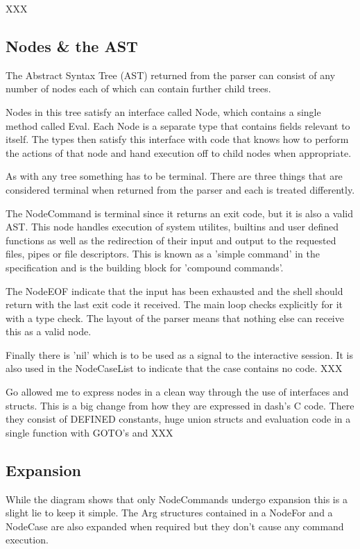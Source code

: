 XXX %

\subsection{Nodes \& the AST}
The Abstract Syntax Tree (AST) returned from the parser can consist of any number of nodes each of which can contain further child trees.

Nodes in this tree satisfy an interface called Node, which contains a single method called Eval.
Each Node is a separate type that contains fields relevant to itself.
The types then satisfy this interface with code that knows how to perform the actions of that node and hand execution off to child nodes when appropriate.

As with any tree something has to be terminal.
There are three things that are considered terminal when returned from the parser and each is treated differently.

The NodeCommand is terminal since it returns an exit code, but it is also a valid AST.
This node handles execution of system utilites, builtins and user defined functions as well as the redirection of their input and output to the requested files, pipes or file descriptors.
This is known as a 'simple command' in the specification and is the building block for 'compound commands'.

The NodeEOF indicate that the input has been exhausted and the shell should return with the last exit code it received.
The main loop checks explicitly for it with a type check.
The layout of the parser means that nothing else can receive this as a valid node.

Finally there is 'nil' which is to be used as a signal to the interactive session.
It is also used in the NodeCaseList to indicate that the case contains no code.
XXX %

Go allowed me to express nodes in a clean way through the use of interfaces and structs.
This is a big change from how they are expressed in dash's C code.
There they consist of DEFINED constants, huge union structs and evaluation code in a single function with GOTO's and XXX

\subsection{Expansion}
While the diagram shows that only NodeCommands undergo expansion this is a slight lie to keep it simple.
The Arg structures contained in a NodeFor and a NodeCase are also expanded when required but they don't cause any command execution.

